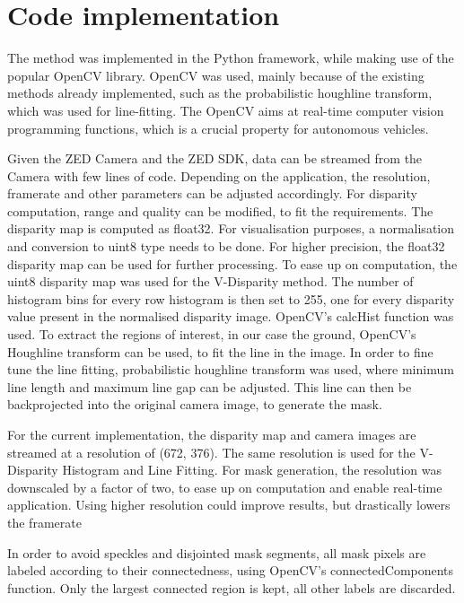 \section{Code implementation}

The method was implemented in the Python framework, while making use of the popular OpenCV library. OpenCV was used, mainly because of the existing methods already implemented, such as the probabilistic houghline transform, which was used for line-fitting. The OpenCV aims at real-time computer vision programming functions, which is a crucial property for autonomous vehicles.
\newline

Given the ZED Camera and the ZED SDK, data can be streamed from the Camera with few lines of code. Depending on the application, the resolution, framerate and other parameters can be adjusted accordingly. For disparity computation, range and quality can be modified, to fit the requirements.
The disparity map is computed as float32. For visualisation purposes, a normalisation and conversion to uint8 type needs to be done. 
For higher precision, the float32 disparity map can be used for further processing. 
To ease up on computation, the uint8 disparity map was used for the V-Disparity method. The number of histogram bins for every row histogram is then set to 255, one for every disparity value present in the normalised disparity image. OpenCV's calcHist function was used.
To extract the regions of interest, in our case the ground, OpenCV's Houghline transform can be used, to fit the line in the image. In order to fine tune the line fitting, probabilistic houghline transform was used, where minimum line length and maximum line gap can be adjusted. This line can then be backprojected into the original camera image, to generate the mask.

For the current implementation, the disparity map and camera images are streamed at a resolution of (672, 376). The same resolution is used for the V-Disparity Histogram and Line Fitting. For mask generation, the resolution was downscaled by a factor of two, to ease up on computation and enable real-time application. Using higher resolution could improve results, but drastically lowers the framerate



In order to avoid speckles and disjointed mask segments, all mask pixels are labeled according to their connectedness, using OpenCV's connectedComponents function. Only the largest connected region is kept, all other labels are discarded. 